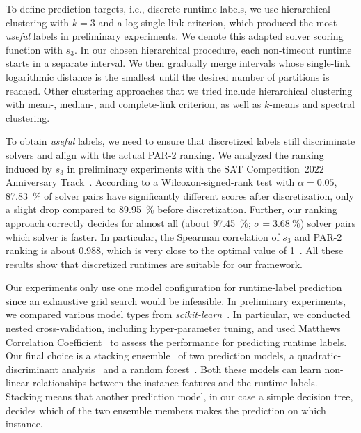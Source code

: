 \documentclass[runningheads]{llncs}
\begin{document}
To define prediction targets, i.e., discrete runtime labels, we use hierarchical clustering with $k = 3$ and a log-single-link criterion, which produced the most \emph{useful} labels in preliminary experiments.
We denote this adapted solver scoring function with $s_3$.
In our chosen hierarchical procedure, each non-timeout runtime starts in a separate interval.
We then gradually merge intervals whose single-link logarithmic distance is the smallest until the desired number of partitions is reached.
Other clustering approaches that we tried include hierarchical clustering with mean-, median-, and complete-link criterion, as well as $k$-means and spectral clustering.

To obtain \emph{useful} labels, we need to ensure that discretized labels still discriminate solvers and align with the actual PAR-2 ranking.
We analyzed the ranking induced by $s_3$ in preliminary experiments with the SAT Competition~2022 Anniversary Track~\cite{sat2022}.
According to a Wilcoxon-signed-rank test with $\alpha = 0.05$, \SI{87.83}{\%} of solver pairs have significantly different scores after discretization, only a slight drop compared to \SI{89.95}{\%} before discretization.
Further, our ranking approach correctly decides for almost all (about \SI{97.45}{\%}; $\sigma = \SI{3.68}{\%}$) solver pairs which solver is faster.
In particular, the Spearman correlation of $s_3$ and PAR-2 ranking is about \SI{0.988}{}, which is very close to the optimal value of 1~\cite{de2016comparing}.
All these results show that discretized runtimes are suitable for our framework.


Our experiments only use one model configuration for runtime-label prediction since an exhaustive grid search would be infeasible.
In preliminary experiments, we compared various model types from \emph{scikit-learn}~\cite{scikit-learn}.
In particular, we conducted nested cross-validation, including hyper-parameter tuning, and used Matthews Correlation Coefficient~\cite{gorodkin2004comparing,matthews1975comparison} to assess the performance for predicting runtime labels.
Our final choice is a stacking ensemble~\cite{wolpert1992stacked} of two prediction models, a quadratic-discriminant analysis~\cite{tharwat2016linear} and a random forest~\cite{breiman2001random}.
Both these models can learn non-linear relationships between the instance features and the runtime labels.
Stacking means that another prediction model, in our case a simple decision tree, decides which of the two ensemble members makes the prediction on which instance.
\end{document}

